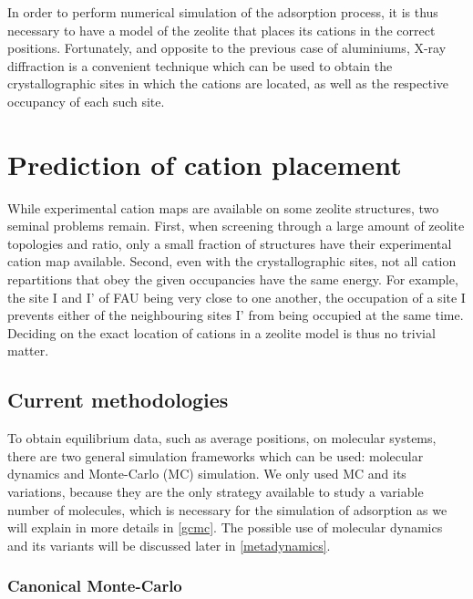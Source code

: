 \documentclass[main.tex]{subfiles}
\begin{document}
In order to perform numerical simulation of the adsorption process, it is thus necessary to have a model of the zeolite that places its cations in the correct positions. Fortunately, and opposite to the previous case of aluminiums, X-ray diffraction is a convenient technique which can be used to obtain the crystallographic sites in which the cations are located, as well as the respective occupancy of each such site.


\section{Prediction of cation placement}

While experimental cation maps are available on some zeolite structures, two seminal problems remain. First, when screening through a large amount of zeolite topologies and \SiAl ratio, only a small fraction of structures have their experimental cation map available. Second, even with the crystallographic sites, not all cation repartitions that obey the given occupancies have the same energy. For example, the site I and I' of FAU being very close to one another, the occupation of a site I prevents either of the neighbouring sites I' from being occupied at the same time. Deciding on the exact location of cations in a zeolite model is thus no trivial matter.

\subsection{Current methodologies}

To obtain equilibrium data, such as average positions, on molecular systems, there are two general simulation frameworks which can be used: molecular dynamics and Monte-Carlo (MC) simulation. We only used MC and its variations, because they are the only strategy available to study a variable number of molecules, which is necessary for the simulation of adsorption as we will explain in more details in \cref{gcmc}. The possible use of molecular dynamics and its variants will be discussed later in \cref{metadynamics}.

\subsubsection{Canonical Monte-Carlo}
\end{document}
